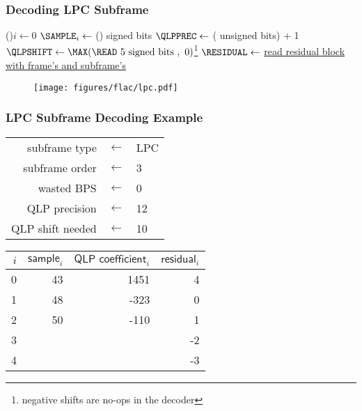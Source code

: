 \subsubsection{Decoding LPC Subframe}
\label{flac:decode_lpc}
{
\For(){$i \leftarrow 0$ \emph{\KwTo}\ORDER}{
  $\text{\SAMPLE}_i \leftarrow $ \READ (\BPS) signed bits\;
}
$\QLPPREC \leftarrow$ ( unsigned bits) + 1\;
$\QLPSHIFT \leftarrow \MAX(\text{\READ 5 signed bits}~,~0)$\footnote{negative shifts are no-ops in the decoder}\;
\BlankLine
$\RESIDUAL \leftarrow$ \hyperref[flac:decode_residual]{read residual block with frame's \BLOCKSIZE and subframe's \ORDER}\;
\BlankLine
{}
\Return \SAMPLE\;
\EALGORITHM
}
\begin{figure}[h]
\texttt{[image: figures/flac/lpc.pdf]}
\end{figure}

\subsubsection{LPC Subframe Decoding Example}
\begin{table}[h]
{
\begin{tabular}{rcl}
  subframe type & $\leftarrow$ & LPC \\
  subframe order & $\leftarrow$ & 3 \\
  wasted BPS & $\leftarrow$ & 0 \\
  QLP precision & $\leftarrow$ & 12 \\
  QLP shift needed & $\leftarrow$ & 10 \\
\end{tabular}
\begin{tabular}{r|rrr}
  $i$ & $\textsf{sample}_i$ & $\textsf{QLP coefficient}_i$ & $\textsf{residual}_i$ \\
\hline
0 & 43 & 1451 & 4 \\
1 & 48 & -323 & 0 \\
2 & 50 & -110 & 1 \\
3 & & & -2 \\
4 & & & -3 \\
\end{tabular}
}
\end{table}

